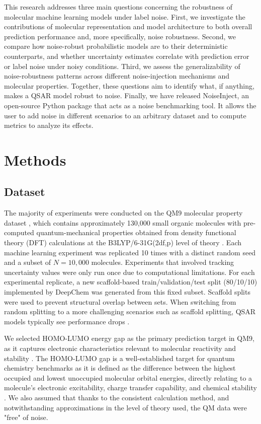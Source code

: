 \documentclass[pdflatex,sn-mathphys-num]{sn-jnl}%
\theoremstyle{thmstyleone}%
\theoremstyle{thmstyletwo}%
\theoremstyle{thmstylethree}%
\begin{document}
This research addresses three main questions concerning the robustness of molecular machine learning models under label noise. First, we investigate the contributions of molecular representation and model architecture to both overall prediction performance and, more specifically, noise robustness. Second, we compare how noise-robust probabilistic models are to their deterministic counterparts, and whether uncertainty estimates correlate with prediction error or label noise under noisy conditions. Third, we assess the generalizability of noise-robustness patterns across different noise-injection mechanisms and molecular properties. Together, these questions aim to identify what, if anything, makes a QSAR model robust to noise. Finally, we have released NoiseInject, an open-source Python package that acts as a noise benchmarking tool. It allows the user to add noise in different scenarios to an arbitrary dataset and to compute metrics to analyze its effects.

\section{Methods}\label{sec2}

\subsection{Dataset}
The majority of experiments were conducted on the QM9 molecular property dataset \citep{Ramakrishnan2014}, which contains approximately 130,000 small organic molecules with pre-computed quantum-mechanical properties obtained from density functional theory (DFT) calculations at the B3LYP/6-31G(2df,p) level of theory \citep{Ramakrishnan2014}. Each machine learning experiment was replicated 10 times with a distinct random seed and a subset of $N = 10{,}000$ molecules. Experiments that involved tracking uncertainty values were only run once due to computational limitations. For each experimental replicate, a new scaffold-based train/validation/test split (80/10/10) implemented by DeepChem \citep{deepchem} was generated from this fixed subset. Scaffold splits were used to prevent structural overlap between sets. When switching from random splitting to a more challenging scenarios such as scaffold splitting, QSAR models typically see performance drops \citep{Heid2023}.

We selected HOMO-LUMO energy gap as the primary prediction target in QM9, as it captures electronic characteristics relevant to molecular reactivity and stability \citep{Islam2019, Hllermeier2021}. The HOMO-LUMO gap is a well-established target for quantum chemistry benchmarks as it is defined as the difference between the highest occupied and lowest unoccupied molecular orbital energies, directly relating to a molecule's electronic excitability, charge transfer capability, and chemical stability \citep{Fediai2023}. We also assumed that thanks to the consistent calculation method, and notwithstanding approximations in the level of theory used, the QM data were "free" of noise.
\end{document}
